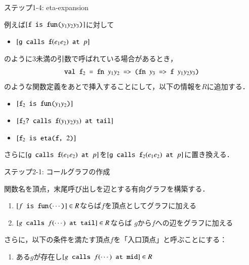 \documentclass[aspectratio=169,t,dvipdfmx,12pt]{beamer}
\newcommand\codestyle{%
  \ttfamily
  \chardef\{=`\{
  \chardef\}=`\}
  \chardef\_=`\_
  \chardef\~=`\~
  \chardef\/=`\\
  \frenchspacing}
\newcommand\code[1]{\texttt{\protect\codestyle #1}}
\begin{document}
\begin{frame}{ステップ1-4: eta-expansion}

例えば$[\code{f is fun($y_1y_2y_3$)}]$に対して
\begin{itemize}
\item $[\code{g calls f$(e_1e_2)$ at $p$}]$
\end{itemize}
のように3未満の引数で呼ばれている場合があるとき，
\[\code{val f$_2$ = fn $y_1y_2$ => (fn $y_3$ => f $y_1y_2y_3$)}\]
のような関数定義をあとで挿入することにして，以下の情報を$R$に追加する．
\begin{itemize}
\item $[\code{f$_2$ is fun($y_1y_2$)}]$
\item $[\code{f$_2$? calls f$(y_1y_2y_3)$ at tail}]$
\item $[\code{f$_2$ is eta(f, $2$)}]$
\end{itemize}

\medskip

さらに$[\code{g calls f$(e_1e_2)$ at $p$}]$を$[\code{g calls f$_2(e_1e_2)$ at $p$}]$に置き換える．

\end{frame}

\begin{frame}{ステップ2-1: コールグラフの作成}

関数名を頂点，末尾呼び出しを辺とする有向グラフを構築する．
\begin{enumerate}
\item $[\code{$f$ is fun($\cdots$)}] \in R$ならば$f$を頂点としてグラフに加える
\item $[\code{$g$ calls $f(\cdots)$ at tail}] \in R$ならば
$g$から$f$への辺をグラフに加える
\end{enumerate}

\bigskip

さらに，以下の条件を満たす頂点$f$を「入口頂点」と呼ぶことにする：
\begin{enumerate}
\item[] ある$g$が存在し$[\code{$g$ calls $f(\cdots)$ at mid}] \in R$
\end{enumerate}

\end{frame}
\end{document}
